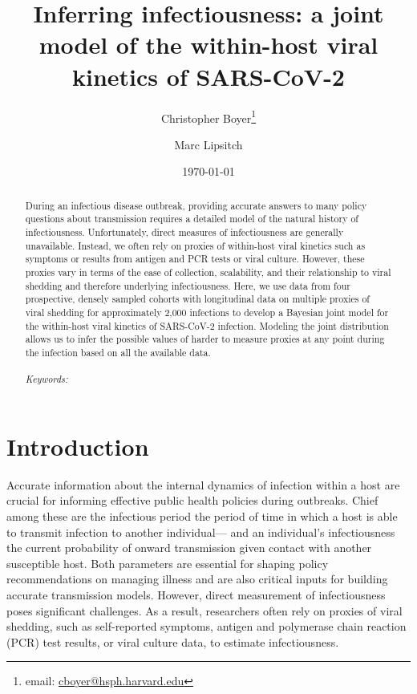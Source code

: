 \documentclass[12pt]{article}
\begin{document}
\begin{titlepage}
\title{Inferring infectiousness: a joint model of the within-host viral kinetics of SARS-CoV-2}
\author[1]{Christopher Boyer\thanks{email: \href{mailto:cboyer@hsph.harvard.edu}{cboyer@hsph.harvard.edu}}}
\author[1,2]{Marc Lipsitch}
\date{\today}
\maketitle

\begin{abstract}
During an infectious disease outbreak, providing accurate answers to many policy questions about transmission requires a detailed model of the natural history of infectiousness. Unfortunately, direct measures of infectiousness are generally unavailable. Instead, we often rely on proxies of within-host viral kinetics such as symptoms or results from antigen and PCR tests or viral culture. However, these proxies vary in terms of the ease of collection, scalability, and their relationship to viral shedding and therefore underlying infectiousness. Here, we use data from four prospective, densely sampled cohorts with longitudinal data on multiple proxies of viral shedding for approximately 2,000 infections to develop a Bayesian joint model for the within-host viral kinetics of SARS-CoV-2 infection. Modeling the joint distribution allows us to infer the possible values of harder to measure proxies at any point during the infection based on all the available data. 
\noindent \\
\vspace{0in} \\
\noindent\textit{Keywords:} 
\bigskip
\end{abstract}
\setcounter{page}{0}
\thispagestyle{empty}
\end{titlepage}
\pagebreak \newpage
{} %
\section{Introduction} \label{sec:introduction}
Accurate information about the internal dynamics of infection within a host are crucial for informing effective public health policies during outbreaks. Chief among these are the infectious period \textemdash the period of time in which a host is able to transmit infection to another individual---  and an individual's infectiousness \textemdash the current probability of onward transmission given contact with another susceptible host. Both parameters are essential for shaping policy recommendations on managing illness and are also critical inputs for building accurate transmission models. However, direct measurement of infectiousness poses significant challenges. As a result, researchers often rely on proxies of viral shedding, such as self-reported symptoms, antigen and polymerase chain reaction (PCR) test results, or viral culture data, to estimate infectiousness.
\end{document}
